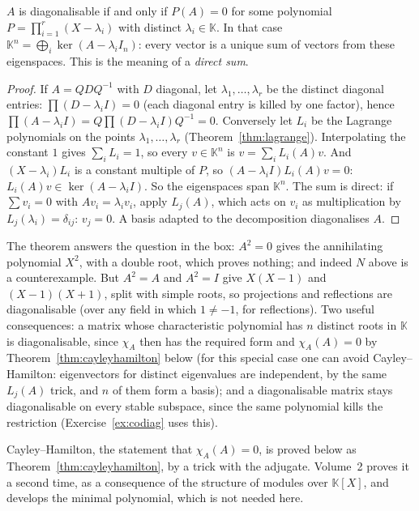 \begin{theorem}[diagonalisability]\label{thm:diag}
$A$ is diagonalisable if and only if $P(A)=0$ for some polynomial $P=\prod_{i=1}^r(X-\lambda_i)$ with distinct $\lambda_i\in\mathbb K$. In that case $\mathbb K^n=\bigoplus_i\ker(A-\lambda_iI_n)$: every vector is a unique sum of vectors from these eigenspaces. This is the meaning of a \emph{direct sum}.
\end{theorem}
\begin{proof}
If $A=QDQ^{-1}$ with $D$ diagonal, let $\lambda_1,\dots,\lambda_r$ be the distinct diagonal entries: $\prod(D-\lambda_iI)=0$ (each diagonal entry is killed by one factor), hence $\prod(A-\lambda_iI)=Q\prod(D-\lambda_iI)Q^{-1}=0$.
Conversely let $L_i$ be the Lagrange polynomials on the points $\lambda_1,\dots,\lambda_r$ (Theorem~\ref{thm:lagrange}). Interpolating the constant $1$ gives $\sum_iL_i=1$, so every $v\in\mathbb K^n$ is $v=\sum_iL_i(A)v$. And $(X-\lambda_i)L_i$ is a constant multiple of $P$, so $(A-\lambda_iI)L_i(A)v=0$: $L_i(A)v\in\ker(A-\lambda_iI)$. So the eigenspaces span $\mathbb K^n$. The sum is direct: if $\sum v_i=0$ with $Av_i=\lambda_iv_i$, apply $L_j(A)$, which acts on $v_i$ as multiplication by $L_j(\lambda_i)=\delta_{ij}$: $v_j=0$. A basis adapted to the decomposition diagonalises $A$.
\end{proof}

The theorem answers the question in the box: $A^2=0$ gives the annihilating polynomial $X^2$, with a double root, which proves nothing; and indeed $N$ above is a counterexample. But $A^2=A$ and $A^2=I$ give $X(X-1)$ and $(X-1)(X+1)$, split with simple roots, so projections and reflections are diagonalisable (over any field in which $1\ne-1$, for reflections). Two useful consequences: a matrix whose characteristic polynomial has $n$ distinct roots in $\mathbb K$ is diagonalisable, since $\chi_A$ then has the required form and $\chi_A(A)=0$ by Theorem~\ref{thm:cayleyhamilton} below (for this special case one can avoid Cayley--Hamilton: eigenvectors for distinct eigenvalues are independent, by the same $L_j(A)$ trick, and $n$ of them form a basis); and a diagonalisable matrix stays diagonalisable on every stable subspace, since the same polynomial kills the restriction (Exercise~\ref{ex:codiag} uses this).

\begin{remark}
Cayley--Hamilton, the statement that $\chi_A(A)=0$, is proved below as Theorem~\ref{thm:cayleyhamilton}, by a trick with the adjugate. Volume~2 proves it a second time, as a consequence of the structure of modules over $\mathbb K[X]$, and develops the minimal polynomial, which is not needed here.
\end{remark}

